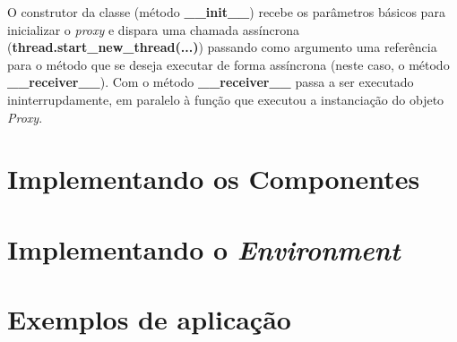 O construtor da classe (método \textbf{\_\_init\_\_}) recebe os parâmetros básicos para inicializar o \textit{proxy} e dispara uma chamada assíncrona (\textbf{thread.start\_new\_thread(...)}) passando como argumento uma referência para o método que se deseja executar de forma assíncrona (neste caso, o método \textbf{\_\_receiver\_\_}). Com o método \textbf{\_\_receiver\_\_} passa a ser executado ininterrupdamente, em paralelo à função que executou a instanciação do objeto \textit{Proxy}.

\section{Implementando os Componentes \label{implement_components}}
\subsection{}
\section{Implementando o \emph{Environment}}
\section{Exemplos de aplicação}


